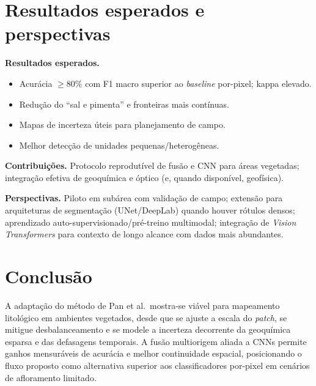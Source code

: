 \documentclass[12pt,a4paper]{article}
\begin{document}
\section{Resultados esperados e perspectivas}
\textbf{Resultados esperados.}
\begin{itemize}[leftmargin=1.2cm]
  \item Acurácia $\geq 80\%$ com F1 macro superior ao \emph{baseline} por-pixel; kappa elevado.
  \item Redução do ``sal e pimenta'' e fronteiras mais contínuas.
  \item Mapas de incerteza úteis para planejamento de campo.
  \item Melhor detecção de unidades pequenas/heterogêneas.
\end{itemize}

\textbf{Contribuições.} Protocolo reprodutível de fusão e CNN para áreas vegetadas; integração efetiva de geoquímica e óptico (e, quando disponível, geofísica).

\textbf{Perspectivas.} Piloto em subárea com validação de campo; extensão para arquiteturas de segmentação (UNet/DeepLab) quando houver rótulos densos; aprendizado auto-supervisionado/pré-treino multimodal; integração de \emph{Vision Transformers} para contexto de longo alcance com dados mais abundantes.

\section{Conclusão}
A adaptação do método de Pan et al.\ mostra-se viável para mapeamento litológico em ambientes vegetados, desde que se ajuste a escala do \emph{patch}, se mitigue desbalanceamento e se modele a incerteza decorrente da geoquímica esparsa e das defasagens temporais. A fusão multiorigem aliada a CNNs permite ganhos mensuráveis de acurácia e melhor continuidade espacial, posicionando o fluxo proposto como alternativa superior aos classificadores por-pixel em cenários de afloramento limitado.

\end{document}
